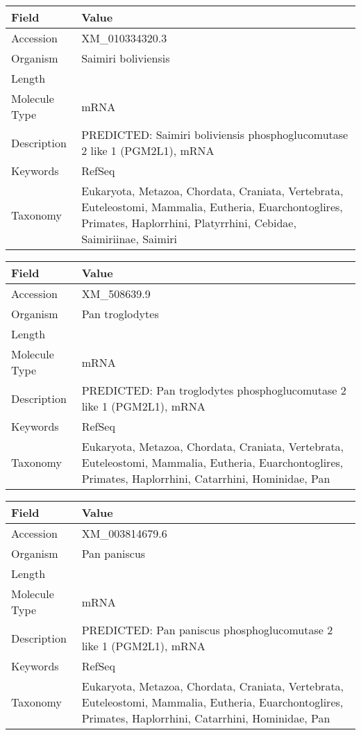\documentclass[10pt]{article}
\begin{document}
\vspace{1em}
{\footnotesize
\begin{longtable}{>{\raggedright\arraybackslash}p{4.5cm} >{\raggedright\arraybackslash}p{11.5cm}}
\textbf{Field} & \textbf{Value} \\
\hline
Accession & XM\_010334320.3 \\
Organism & Saimiri boliviensis \\
Length & 4657 \\
Molecule Type & mRNA \\
Description & PREDICTED: Saimiri boliviensis phosphoglucomutase 2 like 1 (PGM2L1), mRNA \\
Keywords & RefSeq \\
Taxonomy & Eukaryota, Metazoa, Chordata, Craniata, Vertebrata, Euteleostomi, Mammalia, Eutheria, Euarchontoglires, Primates, Haplorrhini, Platyrrhini, Cebidae, Saimiriinae, Saimiri \\
\end{longtable}
}

\vspace{1em}
{\footnotesize
\begin{longtable}{>{\raggedright\arraybackslash}p{4.5cm} >{\raggedright\arraybackslash}p{11.5cm}}
\textbf{Field} & \textbf{Value} \\
\hline
Accession & XM\_508639.9 \\
Organism & Pan troglodytes \\
Length & 8555 \\
Molecule Type & mRNA \\
Description & PREDICTED: Pan troglodytes phosphoglucomutase 2 like 1 (PGM2L1), mRNA \\
Keywords & RefSeq \\
Taxonomy & Eukaryota, Metazoa, Chordata, Craniata, Vertebrata, Euteleostomi, Mammalia, Eutheria, Euarchontoglires, Primates, Haplorrhini, Catarrhini, Hominidae, Pan \\
\end{longtable}
}

\vspace{1em}
{\footnotesize
\begin{longtable}{>{\raggedright\arraybackslash}p{4.5cm} >{\raggedright\arraybackslash}p{11.5cm}}
\textbf{Field} & \textbf{Value} \\
\hline
Accession & XM\_003814679.6 \\
Organism & Pan paniscus \\
Length & 8778 \\
Molecule Type & mRNA \\
Description & PREDICTED: Pan paniscus phosphoglucomutase 2 like 1 (PGM2L1), mRNA \\
Keywords & RefSeq \\
Taxonomy & Eukaryota, Metazoa, Chordata, Craniata, Vertebrata, Euteleostomi, Mammalia, Eutheria, Euarchontoglires, Primates, Haplorrhini, Catarrhini, Hominidae, Pan \\
\end{longtable}
}
\end{document}
